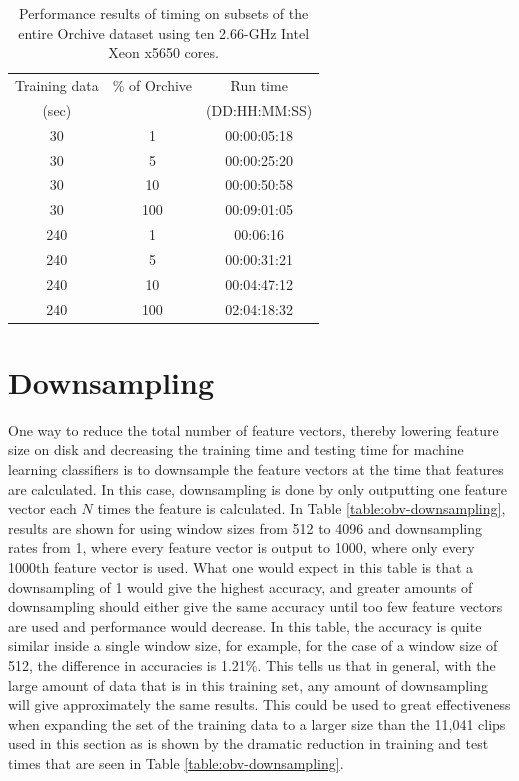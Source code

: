 \begin{table}
\centering
\begin{tabular}{|c|c|c|} 
\hline
Training data & \% of Orchive & Run time \\
\hhline{|~|~|~|}
 (sec)        &               & (DD:HH:MM:SS) \\
\hhline{|=|=|=|}
30            &      1      &    00:00:05:18      	 \\
30            &      5      &    00:00:25:20         \\
30            &      10     &    00:00:50:58         \\
30            &      100    &    00:09:01:05         \\
\hline
240           &      1      &    00:06:16            \\
240           &      5      &    00:00:31:21         \\
240           &      10     &    00:04:47:12         \\
240           &      100    &    02:04:18:32         \\
\hline
\end{tabular}
\caption{Performance results of timing on subsets of the entire
  Orchive dataset using ten 2.66-GHz Intel Xeon x5650 cores.}
\label{table:full-orchive-performance}
\end{table}

%
%
\section{Downsampling}

One way to reduce the total number of feature vectors, thereby
lowering feature size on disk and decreasing the training time and
testing time for machine learning classifiers is to downsample the
feature vectors at the time that features are calculated.  In this
case, downsampling is done by only outputting one feature vector each
$N$ times the feature is calculated.  In Table
\ref{table:obv-downsampling}, results are shown for using window sizes
from 512 to 4096 and downsampling rates from 1, where every feature
vector is output to 1000, where only every 1000th feature vector is
used.  What one would expect in this table is that a downsampling of 1
would give the highest accuracy, and greater amounts of downsampling
should either give the same accuracy until too few feature vectors are
used and performance would decrease.  In this table, the accuracy is
quite similar inside a single window size, for example, for the case
of a window size of 512, the difference in accuracies is 1.21\%.  This
tells us that in general, with the large amount of data that is in
this training set, any amount of downsampling will give approximately
the same results.  This could be used to great effectiveness when
expanding the set of the training data to a larger size than the
11,041 clips used in this section as is shown by the dramatic
reduction in training and test times that are seen in Table
\ref{table:obv-downsampling}.

